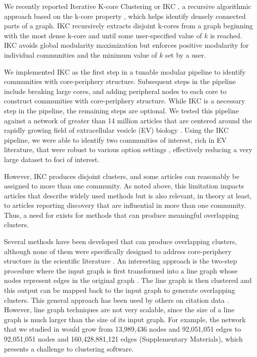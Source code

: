 \documentclass[12pt, oneside]{article}   	%
\begin{document}
We recently reported Iterative K-core Clustering or IKC \citep{Wedell2022}, a recursive algorithmic approach based on the k-core property \citep{Giatsidis2011,malliaros2019}, which helps identify densely connected parts of a graph. IKC recursively extracts disjoint k-cores from a graph beginning with the most dense  k-core and until some user-specified value of $k$ is reached. IKC avoids global modularity maximization \citep{lancichinetti2011limits} but enforces positive modularity for individual communities and the minimum value of $k$ set by a user. 

We implemented IKC as the first step in a tunable modular pipeline to identify communities with core-periphery structure. Subsequent steps in the pipeline include breaking large cores, and adding peripheral nodes to each core to construct communities with core-periphery structure. While IKC is a necessary step in the pipeline, the remaining steps are optional. We tested this pipeline against a network of greater than 14 million articles that are centered around the rapidly growing field of extracellular vesicle (EV) biology \citep{Wedell2022}. Using the IKC pipeline, we were able to identify two communities of interest, rich in EV literature, that were robust to various option settings \citep[Figures 5]{Wedell2022}, effectively reducing a very large dataset to foci of interest. 

However, IKC produces disjoint clusters, and some articles can reasonably be assigned to more than one community. 
As noted above, this limitation impacts articles that describe widely used methods but is also relevant, in theory at least, to articles reporting discovery that are influential in more than one community.  Thus, a need for exists for methods that can produce meaningful overlapping clusters. 

Several methods have been developed that can produce overlapping clusters, although none of them were specifically designed to address core-periphery structure in the scientific literature  \citep{Baumes2005,Palla2005,banerjee2005model,Cleuziou2008,Lancichinetti2009,Lu2012}. An interesting approach is the two-step procedure where the input graph is first transformed into a line graph whose nodes represent edges in the original graph \citep{Harary1960}.  The line graph is then clustered and this output can be mapped back to the input graph to generate overlapping clusters. This general approach has been used by others on citation data \citep{Evans2009,Havemann2021}. However, line graph  techniques are not very scalable, since the size of a line graph is much larger than the size of its input graph. For example, the network that we studied in \cite{Wedell2022} would grow from 13,989,436 nodes and 92,051,051 edges to 92,051,051 nodes and 160,428,881,121 edges (Supplementary Materials), which presents a challenge to clustering software.
 
\end{document}
